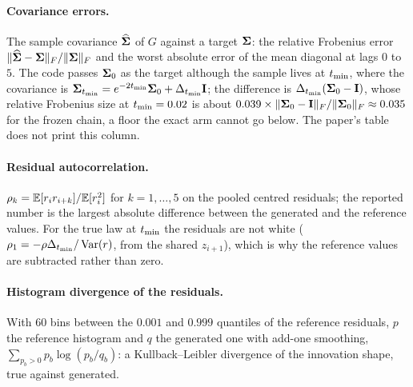 \paragraph{Covariance errors.} The sample covariance $\widehat{\mathbf{\Sigma}}$ of $G$ against a
target $\mathbf{\Sigma}$: the relative Frobenius error $\lVert \widehat{\mathbf{\Sigma}}-\mathbf{\Sigma} \rVert_{F}/\lVert \mathbf{\Sigma} \rVert_{F}$
and the worst absolute error of the mean diagonal at lags $0$ to $5$. The code passes
$\mathbf{\Sigma}_0$ as the target although the sample lives at $t_{\min}$, where the covariance is
$\mathbf{\Sigma}_{t_{\min}}=e^{-2t_{\min}}\mathbf{\Sigma}_0+\Delta_{t_{\min}}\mathbf{I}$; the difference is
$\Delta_{t_{\min}}(\mathbf{\Sigma}_0-\mathbf{I})$, whose relative Frobenius size at $t_{\min}=0.02$ is about
$0.039\times\lVert \mathbf{\Sigma}_0-\mathbf{I} \rVert_{F}/\lVert \mathbf{\Sigma}_0 \rVert_{F}\approx0.035$ for the frozen chain, a floor
the exact arm cannot go below. The paper's table does not print this column.

\paragraph{Residual autocorrelation.} $\rho_k=\mathbb{E}[r_ir_{i+k}]/\mathbb{E}[r_i^2]$ for
$k=1,\dots,5$ on the pooled centred residuals; the reported number is the largest
absolute difference between the generated and the reference values. For the true law
at $t_{\min}$ the residuals are not white ($\rho_1=-\rho\Delta_{t_{\min}}/\operatorname{Var}(r)$, from the
shared $z_{i+1}$), which is why the reference values are subtracted rather than zero.

\paragraph{Histogram divergence of the residuals.} With $60$ bins between the $0.001$
and $0.999$ quantiles of the reference residuals, $p$ the reference histogram and $q$
the generated one with add-one smoothing, $\sum_{p_b>0}p_b\log(p_b/q_b)$: a
Kullback--Leibler divergence of the innovation shape, true against generated.


